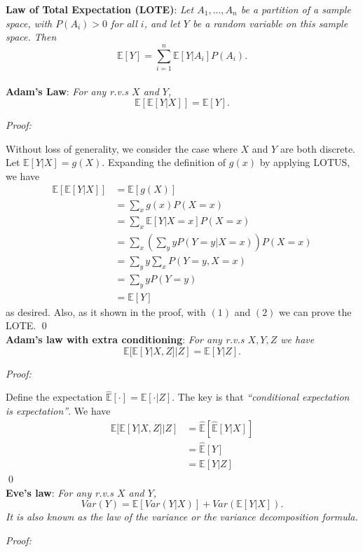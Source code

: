 \documentclass{progartcn}
\begin{document}
		\textbf{Law of Total Expectation (LOTE)}: \textit{ Let $A_1, ..., A_n$ be a partition of a sample space, with $P(A_i ) > 0$ for all $i$, and let $Y$ be a random variable on this sample space. Then}
			\[\mathbb{E}[Y]=\sum_{i=1}^n \mathbb{E}[Y|A_i]P(A_i).\]\\

		\textbf{Adam's Law}: \textit{For any r.v.s $X$ and $Y$,}
		\[\mathbb{E}[\mathbb{E}[Y|X]] = \mathbb{E}[Y].\]

		\textit{Proof:}

		Without loss of generality, we consider the case where $X$ and $Y$ are both discrete. Let $\mathbb{E}[Y|X]=g(X)$. Expanding the definition of $g(x)$ by applying LOTUS, we have
		\begin{align*}
		\mathbb{E}[\mathbb{E}[Y|X]]&=\mathbb{E}[g(X)]\\
		&=\sum_x g(x)P(X=x)\\
		&=\sum_x \mathbb{E}[Y|X=x] P(X=x)\tag{1}\\
		&=\sum_x\left(\sum_y y P(Y=y|X=x)\right)P(X=x)\\
		&=\sum_y y \sum_x P(Y=y,X=x)\\
		&=\sum_y y P(Y=y)\\
		&=\mathbb{E}[Y]\tag{2}
		\end{align*}
		as desired. Also, as it shown in the proof, with $(1)$ and $(2)$ we can prove the LOTE.
		\qed\\

		\textbf{Adam's law with extra conditioning}: \textit{For any r.v.s $X,Y,Z$ we have}
		\[\mathbb{E}[\mathbb{E}[Y|X,Z]|Z]=\mathbb{E}[Y|Z].\]

		\textit{Proof:}

		Define the expectation $\hat{\mathbb{E}}[\cdot ] =\mathbb{E}[\cdot | Z]$. The key is that \textit{``conditional expectation is expectation''}. We have
		\begin{align*}
		\mathbb{E}[\mathbb{E}[Y|X,Z]|Z]&=\hat{\mathbb{E}}[\hat{\mathbb{E}}[Y|X]]\\
		&=\hat{\mathbb{E}}[Y] \tag{by Adam's Law}\\
		&=\mathbb{E}[Y|Z]
		\end{align*}
		\qed\\

		\textbf{Eve's law}: \textit{ For any r.v.s $X$ and $Y$,}
		\[Var(Y)=\mathbb{E}[Var(Y|X)]+Var(\mathbb{E}[Y|X]).\]
		\textit{It is also known as the law of the variance or the variance decomposition formula.}

		\textit{Proof:}
		
\end{document}
